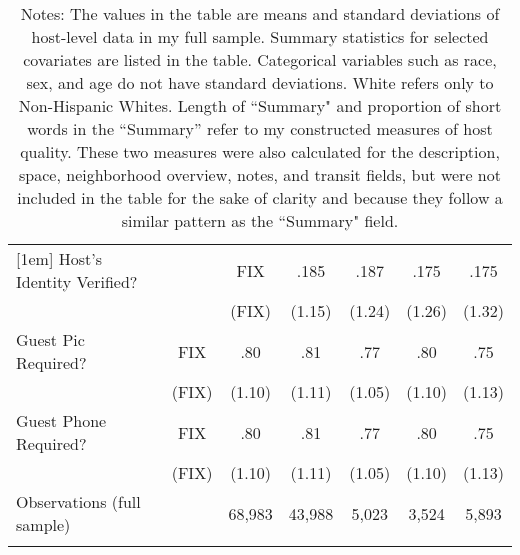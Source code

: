 {\begin{longtable}{l*{6}{c}}
		[1em]
		Host's Identity Verified?          &  &      FIX		&      .185		&       .187         &      .175    &	.175     \\
		& &     (FIX)         &     (1.15)         &     (1.24)         &     (1.26)         &		(1.32)\\                    
		[1em]
		Guest Pic Required?   &   FIX  &      .80		&      .81&      .77 &      .80  	& 	.75\\
		&  (FIX)  & (1.10)     &     (1.11)         &     (1.05)         &     (1.10)         &     (1.13)         \\
		Guest Phone Required?   &   FIX  &      .80		&      .81&      .77 &      .80  	& 	.75\\
		&  (FIX)  & (1.10)     &     (1.11)         &     (1.05)         &     (1.10)         &     (1.13)         \\
		
		
		\hline
		Observations (full sample)    &  & 68,983   &       43,988         &       5,023         &       3,524         &       5,893         \\
		\hline\hline
		\caption*{Notes: The values in the table are means and standard deviations of host-level data in my full sample. Summary statistics for selected covariates are listed in the table. Categorical variables such as race, sex, and age do not have standard deviations. White refers only to Non-Hispanic Whites. Length of ``Summary" and proportion of short words in the ``Summary'' refer to my constructed measures of host quality. These two measures were also calculated for the description, space, neighborhood overview, notes, and transit fields, but were not included in the table for the sake of clarity and because they follow a similar pattern as the ``Summary" field.}
		
	\end{longtable}
}

